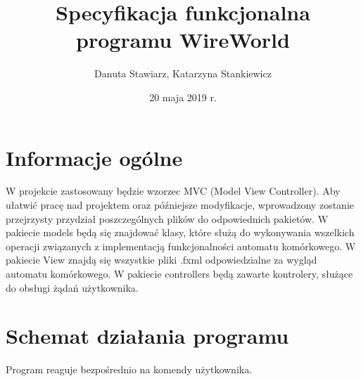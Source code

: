 \documentclass[10pt, oneside]{article}
\title{Specyfikacja funkcjonalna programu WireWorld}
\author{Danuta Stawiarz, Katarzyna Stankiewicz}
\date{20 maja 2019 r.}
\begin{document}
\maketitle
\tableofcontents
\newpage	


\section {Informacje ogólne}

W projekcie zastosowany będzie wzorzec MVC (Model View Controller). Aby ułatwić pracę nad projektem oraz późniejsze modyfikacje, wprowadzony zostanie przejrzysty przydział poszczególnych plików do odpowiednich pakietów. 
W pakiecie models będą się znajdować klasy, które służą do wykonywania wszelkich operacji związanych z implementacją funkcjonalności automatu komórkowego.
W pakiecie View znajdą się wszystkie pliki .fxml odpowiedzialne za wygląd automatu komórkowego.
W pakiecie controllers będą zawarte kontrolery, służące do obsługi żądań użytkownika.

\section{Schemat działania programu}
Program reaguje bezpośrednio na komendy użytkownika. 
\end{document}

